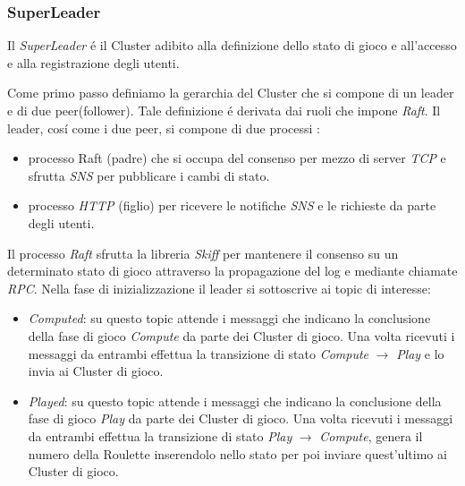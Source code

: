 \documentclass{sig-alternate-05-2015}
\begin{document}
\subsubsection{SuperLeader}


Il \textit{SuperLeader} \'e il Cluster adibito alla definizione dello stato di gioco e all'accesso e alla registrazione degli utenti.

Come primo passo definiamo la gerarchia del Cluster che si compone di un leader e di due peer(follower).
Tale definizione \'e derivata dai ruoli che impone \textit{Raft}.
Il leader, cos\'i come i due peer, si compone di due processi :
\begin{itemize}
\item processo Raft (padre) che si occupa del consenso per mezzo di server \textit{TCP} e sfrutta \textit{SNS} per pubblicare i cambi di stato.
\item processo \textit{HTTP} (figlio) per ricevere le notifiche \textit{SNS} e le richieste da parte degli utenti.
\end{itemize}

Il processo \textit{Raft} sfrutta la libreria \textit{Skiff} per mantenere il consenso su un determinato stato di gioco attraverso la propagazione del log e mediante chiamate \textit{RPC}.
Nella fase di inizializzazione il leader si sottoscrive ai topic di interesse:
\begin{itemize}
\item \textit{Computed}: su questo topic attende i messaggi che indicano la conclusione della fase di gioco \textit{Compute} da parte dei Cluster di gioco. Una volta ricevuti i messaggi da entrambi effettua la transizione di stato \textit{Compute} $\rightarrow$ \textit{Play} e lo invia ai Cluster di gioco. 
\item \textit{Played}: su questo topic attende i messaggi che indicano la conclusione della fase di gioco \textit{Play} da parte dei Cluster di gioco. Una volta ricevuti i messaggi da entrambi effettua la transizione di stato \textit{Play} $\rightarrow$  \textit{Compute},  genera il numero della Roulette inserendolo nello stato per poi inviare quest'ultimo ai Cluster di gioco.
\end{itemize}
\end{document}

